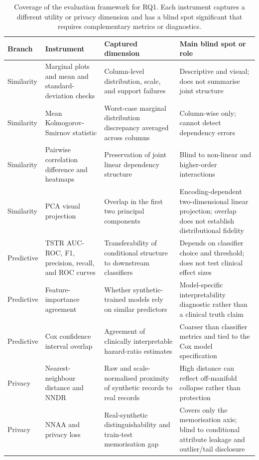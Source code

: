 \begin{table}[!htbp]
\centering
\footnotesize
\setlength{\tabcolsep}{3.5pt}
\caption{Coverage of the evaluation framework for RQ1. Each instrument
captures a different utility or privacy dimension and has a blind spot
significant that requires complementary metrics or diagnostics.}
\label{tab:rq1-coverage}
\begin{tabular}{p{2.0cm}p{3.2cm}p{4.0cm}p{4.2cm}}
\toprule
Branch & Instrument & Captured dimension & Main blind spot or role \\
\midrule
Similarity & Marginal plots and mean and standard-deviation checks & Column-level distribution, scale, and support failures & Descriptive and visual; does not summarise joint structure \\
Similarity & Mean Kolmogorov-Smirnov statistic & Worst-case marginal distribution discrepancy averaged across columns & Column-wise only; cannot detect dependency errors \\
Similarity & Pairwise correlation difference and heatmaps & Preservation of joint linear dependency structure & Blind to non-linear and higher-order interactions \\
Similarity & PCA visual projection & Overlap in the first two principal components & Encoding-dependent two-dimensional linear projection; overlap does not establish distributional fidelity \\
\midrule
Predictive & TSTR AUC-ROC, F1, precision, recall, and ROC curves & Transferability of conditional structure to downstream classifiers & Depends on classifier choice and threshold; does not test clinical effect sizes \\
Predictive & Feature-importance agreement & Whether synthetic-trained models rely on similar predictors & Model-specific interpretability diagnostic rather than a clinical truth claim \\
Predictive & Cox confidence interval overlap & Agreement of clinically interpretable hazard-ratio estimates & Coarser than classifier metrics and tied to the Cox model specification \\
\midrule
Privacy & Nearest-neighbour distance and NNDR & Raw and scale-normalised proximity of synthetic records to real records & High distance can reflect off-manifold collapse rather than protection \\
Privacy & NNAA and privacy loss & Real-synthetic distinguishability and train-test memorisation gap & Covers only the memorisation axis; blind to conditional attribute leakage and outlier/tail disclosure \\

\end{tabular}
\end{table}
